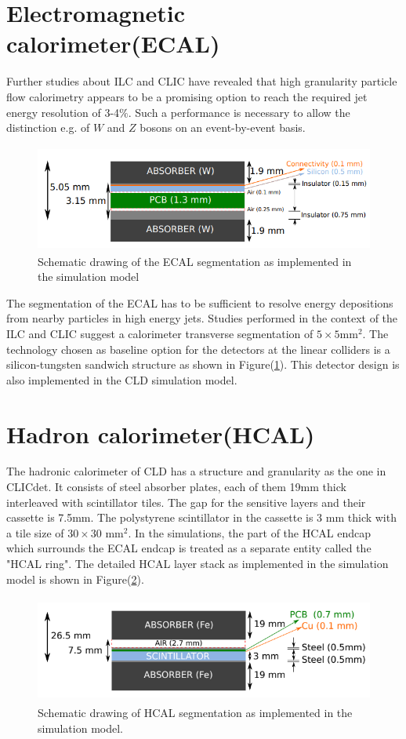 \section{Electromagnetic calorimeter(ECAL)}
Further studies about  ILC and CLIC have revealed 
that high granularity particle flow calorimetry appears to be a 
promising option to reach the required jet energy resolution of 
3-4$\%$. Such a performance is necessary to allow the 
distinction e.g. of $W$ and $Z$ bosons on an event-by-event basis.
\begin{figure}[ht]
    \centering
    \includegraphics[width = 12cm, height = 3.5cm]{fcc_det/ph10.png}
    \caption{Schematic drawing of the ECAL segmentation as implemented in the simulation model}
    \label{fig:ecal}
\end{figure}
The segmentation of the ECAL has to be sufficient to resolve 
energy depositions from nearby particles in
high energy jets. Studies performed in the context of the ILC 
and CLIC suggest a calorimeter transverse
segmentation of $5 \times 5$mm$^2$.
The technology chosen as baseline option for the detectors at 
the linear colliders is a silicon-tungsten sandwich structure as shown in Figure(\ref{fig:ecal}).
This detector design is also implemented in the CLD simulation
model.


\section{Hadron calorimeter(HCAL)}
The  hadronic
calorimeter of CLD has a structure and granularity as the one 
in CLICdet. It consists of steel absorber
plates, each of them 19mm thick interleaved with scintillator 
tiles. The gap for the 
sensitive layers and their cassette is 7.5mm.
The polystyrene scintillator in the cassette is 3 mm thick with 
a tile size of $30 \times 30$ mm$^2$.
In the simulations,
the part of the HCAL endcap which surrounds the ECAL endcap  is 
treated as a separate
entity called the "HCAL ring". The detailed HCAL layer stack as implemented in the simulation 
model is shown in Figure(\ref{fig:hcal}).
\begin{figure}[ht]
    \centering
    \includegraphics[width = 12cm, height = 3.5cm]{fcc_det/ph11.png}
    \caption{ Schematic drawing of HCAL segmentation as implemented in the simulation model.
    }
    \label{fig:hcal}
\end{figure}


